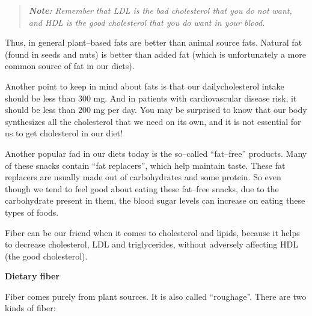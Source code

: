 \begin{quote}
\textit{\textbf{Note:} Remember that LDL is the bad cholesterol that you do not want, and HDL is the good cholesterol that you do want in your blood.}
\end{quote}

Thus, in general plant–based fats are better than animal source fats. Natural fat (found in seeds and nuts) is better than added fat (which is unfortunately a more common source of fat in our diets).

Another point to keep in mind about fats is that our daily\break cholesterol intake should be less than 300 mg. And in patients with cardiovascular disease risk, it should be less than 200 mg per day. You may be surprised to know that our body synthesizes all the cholesterol that we need on its own, and it is not essential for us to get cholesterol in our diet!

Another popular fad in our diets today is the so–called “fat–free” products. Many of these snacks contain “fat replacers”, which help maintain taste. These fat replacers are usually made out of carbohydrates and some protein. So even though we tend to feel good about eating these fat–free snacks, due to the carbohydrate present in them, the blood sugar levels can increase on eating these types of foods.

Fiber can be our friend when it comes to cholesterol and lipids, because it helps to decrease cholesterol, LDL and triglycerides, without adversely affecting HDL (the good cholesterol).

\noindent\textbf{Dietary fiber}

Fiber comes purely from plant sources. It is also called “roughage”. There are two kinds of fiber:

